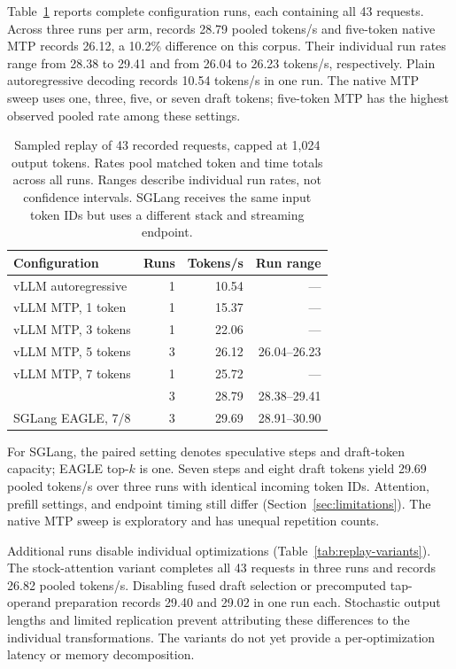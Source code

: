 Table~\ref{tab:request-replay} reports complete configuration runs, each containing all 43 requests. Across three runs per arm, \sys{} records 28.79 pooled tokens/s and five-token native MTP records 26.12, a 10.2\% difference on this corpus. Their individual run rates range from 28.38 to 29.41 and from 26.04 to 26.23 tokens/s, respectively. Plain autoregressive decoding records 10.54 tokens/s in one run. The native MTP sweep uses one, three, five, or seven draft tokens; five-token MTP has the highest observed pooled rate among these settings.

\begin{table}[t]
\caption{Sampled replay of 43 recorded requests, capped at 1,024 output tokens. Rates pool matched token and time totals across all runs. Ranges describe individual run rates, not confidence intervals. SGLang receives the same input token IDs but uses a different stack and streaming endpoint.}
\label{tab:request-replay}
\centering\small
\begin{tabular}{@{}lrrr@{}}
\toprule
Configuration & Runs & Tokens/s & Run range \\
\midrule
vLLM autoregressive & 1 & 10.54 & --- \\
vLLM MTP, 1 token & 1 & 15.37 & --- \\
vLLM MTP, 3 tokens & 1 & 22.06 & --- \\
vLLM MTP, 5 tokens & 3 & 26.12 & 26.04--26.23 \\
vLLM MTP, 7 tokens & 1 & 25.72 & --- \\
\sys{} & 3 & 28.79 & 28.38--29.41 \\
\midrule
SGLang EAGLE, 7/8 & 3 & 29.69 & 28.91--30.90 \\
\bottomrule
\end{tabular}
\end{table}

For SGLang, the paired setting denotes speculative steps and draft-token capacity; EAGLE top-$k$ is one. Seven steps and eight draft tokens yield 29.69 pooled tokens/s over three runs with identical incoming token IDs. Attention, prefill settings, and endpoint timing still differ (Section~\ref{sec:limitations}). The native MTP sweep is exploratory and has unequal repetition counts.

Additional runs disable individual \sys{} optimizations (Table~\ref{tab:replay-variants}). The stock-attention variant completes all 43 requests in three runs and records 26.82 pooled tokens/s. Disabling fused draft selection or precomputed tap-operand preparation records 29.40 and 29.02 in one run each. Stochastic output lengths and limited replication prevent attributing these differences to the individual transformations. The variants do not yet provide a per-optimization latency or memory decomposition.

